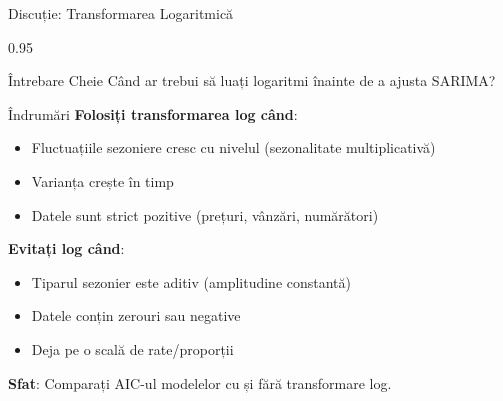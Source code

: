 \documentclass[9pt, aspectratio=169, t]{beamer}
\begin{document}
\begin{frame}{Discuție: Transformarea Logaritmică}
    \begin{cminipage}{0.95\textwidth}
    \begin{block}{Întrebare Cheie}
        Când ar trebui să luați logaritmi înainte de a ajusta SARIMA?
    \end{block}

    \vspace{0.1cm}

    \begin{block}{Îndrumări}
        \textbf{Folosiți transformarea log când}:
        \begin{itemize}\setlength{\itemsep}{0pt}
            \item Fluctuațiile sezoniere cresc cu nivelul (sezonalitate multiplicativă)
            \item Varianța crește în timp
            \item Datele sunt strict pozitive (prețuri, vânzări, numărători)
        \end{itemize}

        \vspace{0.1cm}
        \textbf{Evitați log când}:
        \begin{itemize}\setlength{\itemsep}{0pt}
            \item Tiparul sezonier este aditiv (amplitudine constantă)
            \item Datele conțin zerouri sau negative
            \item Deja pe o scală de rate/proporții
        \end{itemize}

        \vspace{0.1cm}
        \textbf{Sfat}: Comparați AIC-ul modelelor cu și fără transformare log.
    \end{block}
    \end{cminipage}
\end{frame}
\end{document}
